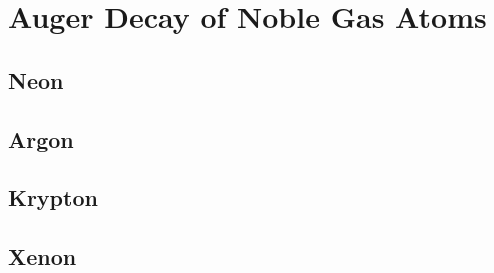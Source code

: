 \section{Auger Decay of Noble Gas Atoms}
\subsection{Neon}
\subsection{Argon}
\subsection{Krypton}
\subsection{Xenon}
